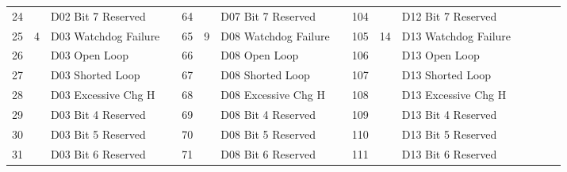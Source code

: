 \documentclass[]{article}
\begin{document}
\begin{landscape}
\begin{table}[]
\begin{tabular}{lllllllllllllll}
			24           &                    & D02 Bit 7 Reserved            &                   & 64           &                     & D07 Bit 7 Reserved   &  & 104          &                     & D12 Bit 7 Reserved   &  &                   &                     &                      \\ \cline{1-3} \cline{5-7} \cline{9-11}
			25           & \multirow{8}{*}{4} & D03 Watchdog Failure          &                   & 65           & \multirow{8}{*}{9}  & D08 Watchdog Failure &  & 105          & \multirow{8}{*}{14} & D13 Watchdog Failure &  &                   &                     &                      \\
			26           &                    & D03 Open Loop                 &                   & 66           &                     & D08 Open Loop        &  & 106          &                     & D13 Open Loop        &  &                   &                     &                      \\
			27           &                    & D03 Shorted Loop              &                   & 67           &                     & D08 Shorted Loop     &  & 107          &                     & D13 Shorted Loop     &  &                   &                     &                      \\
			28           &                    & D03 Excessive Chg H           &                   & 68           &                     & D08 Excessive Chg H  &  & 108          &                     & D13 Excessive Chg H  &  &                   &                     &                      \\
			29           &                    & D03 Bit 4 Reserved            &                   & 69           &                     & D08 Bit 4 Reserved   &  & 109          &                     & D13 Bit 4 Reserved   &  &                   &                     &                      \\
			30           &                    & D03 Bit 5 Reserved            &                   & 70           &                     & D08 Bit 5 Reserved   &  & 110          &                     & D13 Bit 5 Reserved   &  &                   &                     &                      \\
			31           &                    & D03 Bit 6 Reserved            &                   & 71           &                     & D08 Bit 6 Reserved   &  & 111          &                     & D13 Bit 6 Reserved   &  &                   &                     &                      \\

\end{tabular}
\end{table}
\end{landscape}
\end{document}
